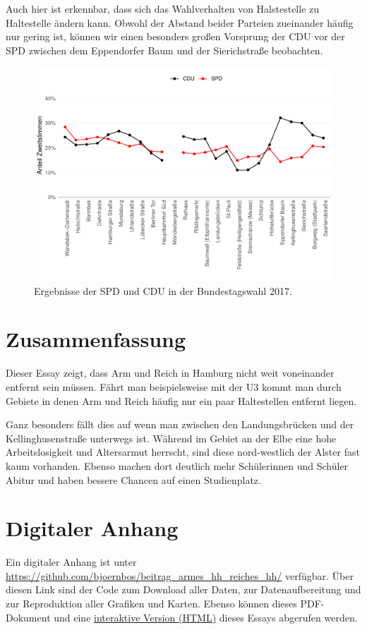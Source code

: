 \documentclass[10pt,a4paper]{article}
\begin{document}
Auch hier ist erkennbar, dass sich das Wahlverhalten von Halstestelle zu Haltestelle ändern kann. Obwohl der Abstand beider Parteien zueinander häufig nur gering ist, können wir einen besonders großen Vorsprung der CDU vor der SPD zwischen dem Eppendorfer Baum und der Sierichstraße beobachten.

\begin{figure}[h!]
	\centering
	\caption{Ergebnisse der SPD und CDU in der Bundestagswahl 2017.}
	\label{fig:ergebnis_bundestagswahl_2017}
	\includegraphics[width=0.8\linewidth]{../../02_results/fig_ergebnis_bundestagswahl_2017.pdf}
\end{figure}


\section*{Zusammenfassung}
Dieser Essay zeigt, dass Arm und Reich in Hamburg nicht weit voneinander entfernt sein müssen. Fährt man beispielsweise mit der U3 kommt man durch Gebiete in denen Arm und Reich häufig nur ein paar Haltestellen entfernt liegen.

Ganz besonders fällt dies auf wenn man zwischen den Landungsbrücken und der Kellinghusenstraße unterwegs ist.  Während im Gebiet an der Elbe eine hohe Arbeitslosigkeit und Altersarmut herrscht, sind diese nord-westlich der Alster fast kaum vorhanden. Ebenso machen dort deutlich mehr Schülerinnen und Schüler Abitur und haben bessere Chancen auf einen Studienplatz.



\onehalfspacing



\section*{Digitaler Anhang }
Ein digitaler Anhang ist unter \url{https://github.com/bjoernbos/beitrag_armes_hh_reiches_hh/} verfügbar. Über diesen Link sind der Code zum Download aller Daten, zur Datenaufbereitung und zur Reproduktion aller Grafiken und Karten. Ebenso können dieses PDF-Dokument und eine \href{http://bjoernbos.github.io/beitrag_armes_hh_reiches_hh/}{interaktive Version (HTML)} dieses Essays abgerufen werden.
\end{document}
